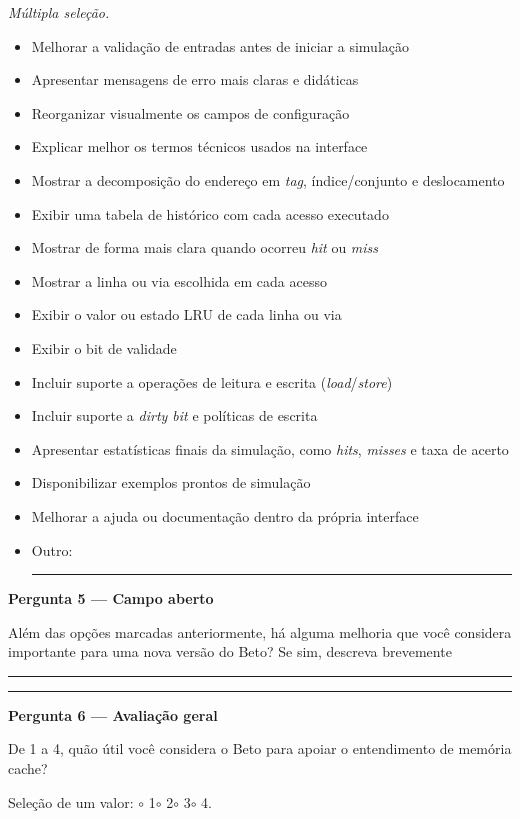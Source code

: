 \emph{Múltipla seleção.}
\begin{itemize}[label=\caixaOpcao]
\item Melhorar a validação de entradas antes de iniciar a simulação
\item Apresentar mensagens de erro mais claras e didáticas
\item Reorganizar visualmente os campos de configuração
\item Explicar melhor os termos técnicos usados na interface
\item Mostrar a decomposição do endereço em \textit{tag}, índice/conjunto e deslocamento
\item Exibir uma tabela de histórico com cada acesso executado
\item Mostrar de forma mais clara quando ocorreu \textit{hit} ou \textit{miss}
\item Mostrar a linha ou via escolhida em cada acesso
\item Exibir o valor ou estado LRU de cada linha ou via
\item Exibir o bit de validade
\item Incluir suporte a operações de leitura e escrita (\textit{load}/\textit{store})
\item Incluir suporte a \textit{dirty bit} e políticas de escrita
\item Apresentar estatísticas finais da simulação, como \textit{hits}, \textit{misses} e taxa de acerto
\item Disponibilizar exemplos prontos de simulação
\item Melhorar a ajuda ou documentação dentro da própria interface
\item Outro: \rule{.65\linewidth}{.3pt}
\end{itemize}

\textbf{Pergunta 5 --- Campo aberto}\par
Além das opções marcadas anteriormente, há alguma melhoria que você considera importante para uma nova versão do Beto? Se sim, descreva brevemente
\par\vspace{.5em}\noindent\rule{\linewidth}{.3pt}\par\vspace{1em}\noindent\rule{\linewidth}{.3pt}

\textbf{Pergunta 6 --- Avaliação geral}\par
De 1 a 4, quão útil você considera o Beto para apoiar o entendimento de memória cache?
\par\noindent Seleção de um valor: $\circ$ 1\qquad $\circ$ 2\qquad $\circ$ 3\qquad $\circ$ 4.
\endgroup
